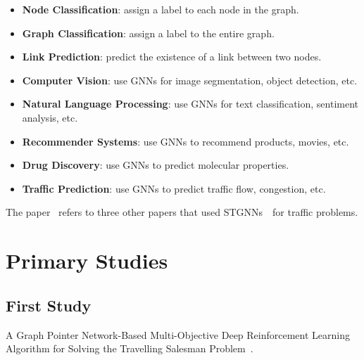 \documentclass[conference]{IEEEtran}
\begin{document}
    \begin{itemize}
        \item \textbf{Node Classification}: assign a label to each node in the graph.
        \item \textbf{Graph Classification}: assign a label to the entire graph.
        \item \textbf{Link Prediction}: predict the existence of a link between two nodes.
        \item \textbf{Computer Vision}: use GNNs for image segmentation, object detection, etc.
        \item \textbf{Natural Language Processing}: use GNNs for text classification, sentiment analysis, etc.
        \item \textbf{Recommender Systems}: use GNNs to recommend products, movies, etc.
        \item \textbf{Drug Discovery}: use GNNs to predict molecular properties.
        \item \textbf{Traffic Prediction}: use GNNs to predict traffic flow, congestion, etc.
    \end{itemize}

    The paper~\cite{Wu_2021} refers to three other papers that used STGNNs~\cite{zhang2018gaan,li2018diffusion,ijcai2018p505}~for traffic problems.


    \section{Primary Studies}\label{sec:primary-studies}

    \subsection{First Study}\label{subsec:first-study}
    A Graph Pointer Network-Based Multi-Objective Deep Reinforcement Learning Algorithm for Solving the Travelling Salesman Problem~\cite{math11020437}.
\end{document}

